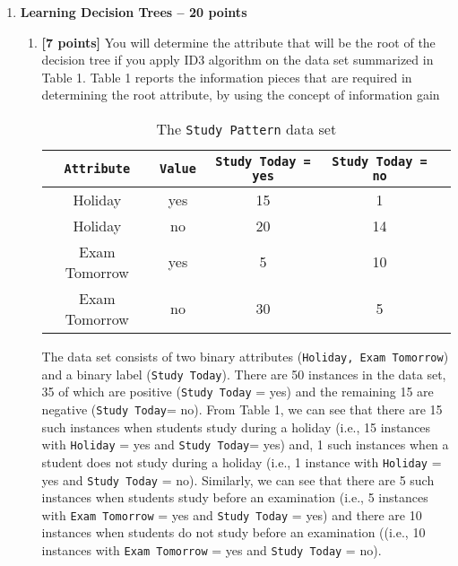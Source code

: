 \begin{enumerate}
\item \textbf{Learning Decision Trees -- 20 points}

  \begin{enumerate}
  \item \textbf{[7 points]} You will determine the attribute that will be the root of the decision tree if you apply ID3 algorithm on the data set summarized in Table 1. Table 1
reports the information pieces that are required in determining the root attribute,
by using the concept of information gain

  \begin{table}[h]
    \centering
    \begin{tabular}[h]{|c|c|c|c|c|}
      \hline
      \texttt{Attribute} & \texttt{Value} & \texttt{Study Today = yes} & \texttt{Study Today = no} \\
      \hline
      Holiday      & yes      & 15   & 1       \\
      Holiday      & no      & 20   & 14        \\
      Exam Tomorrow      & yes      & 5       & 10        \\
      Exam Tomorrow      & no      & 30       & 5        \\
      \hline
    \end{tabular}
    \caption{The {\tt Study Pattern} data set}
    \label{tab:Balloons}
  \end{table}
  
  The data set consists of two binary attributes (\texttt{Holiday, Exam Tomorrow}) and a
binary label (\texttt{Study Today}). There are 50 instances in the data set, 35 of which are positive (\texttt{Study Today} = yes) and the remaining 15 are negative (\texttt{Study Today}= no). From Table 1, we can see that there are 15 such instances when students
study during a holiday (i.e., 15 instances with \texttt{Holiday} = yes and \texttt{Study Today}= yes) and, 1 such instances when a student does not study during a holiday (i.e.,
1 instance with \texttt{Holiday} = yes and \texttt{Study Today} = no). Similarly, we can
see that there are 5 such instances when students study before an examination
(i.e., 5 instances with \texttt{Exam Tomorrow} = yes and \texttt{Study Today} = yes) and there are 10 instances when students do not study before an examination ((i.e., 10
instances with \texttt{Exam Tomorrow} = yes and \texttt{Study Today} = no).


\end{enumerate}
\end{enumerate}
